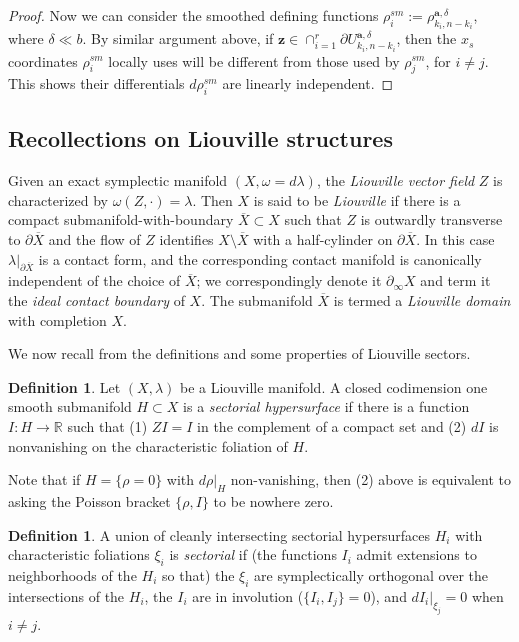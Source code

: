 \documentclass{article}
\def\R{\mathbb{R}}
\def\C{\mathbb{C}}
\def\d{\partial}
\def\bz{\mathbf{z}} %
\def\ba{\mathbf{a}} %
\theoremstyle{definition}
\newtheorem{definition}
[theorem]{Definition}
\begin{document}
\begin{proof}
Now we can consider the smoothed defining functions $\rho_i^{sm}:=\rho^{\ba, \delta}_{k_i, n-k_i}$, where $\delta \ll b$. By similar argument above, if $\bz \in \cap_{i=1}^r \d U^{\ba,\delta}_{k_i, n-k_i}$, then the $x_s$ coordinates $\rho_i^{sm}$ locally uses will be different from those used by $\rho_j^{sm}$, for $i\neq j$. This shows their differentials $d \rho_i^{sm}$ are linearly independent. 

\end{proof}

\subsection{Recollections on Liouville structures}
\label{sec: sector review}



Given an exact symplectic manifold $(X, \omega = d \lambda)$, the {\em Liouville vector field} $Z$ is characterized by $\omega(Z, \cdot) = \lambda$.  Then $X$ is said to be {\em Liouville} if there is a compact submanifold-with-boundary $\overline{X} \subset X$ such that $Z$ is outwardly transverse to $\partial \overline{X}$ and the flow of $Z$ identifies $X \setminus \overline{X}$ with a half-cylinder on $\partial \overline{X}$.  In this case $\lambda|_{\partial \overline{X}}$ is a contact form, and the corresponding contact manifold is canonically independent of the choice of $\overline{X}$; we correspondingly denote it $\partial_\infty X$ and term it the {\em ideal contact boundary} of $X$.  The submanifold $\overline{X}$ is termed a {\em Liouville domain} with completion $X$.  

We now recall from \cite{GPS1, GPS2} the definitions and some properties of Liouville sectors. 


\begin{definition} \cite{GPS1}
    Let $(X, \lambda)$ be a Liouville manifold.
    A closed codimension one smooth submanifold $H \subset X$ is a {\em sectorial hypersurface} if there is a function $I: H \to \R$ such that (1) $ZI = I$ in the complement of a compact set and (2) $dI$ is nonvanishing on the characteristic foliation of $H$. 
\end{definition}

    Note that if $H = \{\rho = 0\}$ with $d\rho|_H$ non-vanishing, then  (2) above is equivalent to asking the Poisson bracket $\{\rho, I\}$ to be nowhere zero. 

\begin{definition} \cite[Def. 12.2]{GPS2}
     A union of cleanly intersecting sectorial hypersurfaces $H_i$ with characteristic foliations $\xi_i$ is {\em sectorial} if (the functions $I_i$ admit extensions to neighborhoods of the $H_i$ so that) 
    the $\xi_i$ are symplectically orthogonal over the intersections of the $H_i$, the $I_i$ are in involution ($\{I_i, I_j\} = 0$), and $d I_i|_{\xi_j} = 0$ when $i \ne j$. 
\end{definition}
\end{document}
